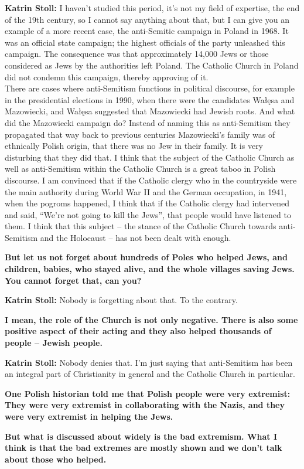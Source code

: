 \textbf{Katrin Stoll:} I haven’t studied this period, it’s not my field of expertise, the end of the 19th century, so I cannot say anything about that, but I can give you an example of a more recent case, the anti-Semitic campaign in Poland in 1968. It was an official state campaign; the highest officials of the party unleashed this campaign. The consequence was that approximately 14,000 Jews or those considered as Jews by the authorities left Poland. The Catholic Church in Poland did not condemn this campaign, thereby approving of it.\\ There are cases where anti-Semitism functions in political discourse, for example in the presidential elections in 1990, when there were the candidates Wałęsa and Mazowiecki, and Wałęsa suggested that Mazowiecki had Jewish roots. And what did the Mazowiecki campaign do? Instead of naming this as anti-Semitism they propagated that way back to previous centuries Mazowiecki’s family was of ethnically Polish origin, that there was no Jew in their family. It is very disturbing that they did that. I think that the subject of the Catholic Church as well as anti-Semitism within the Catholic Church is a great taboo in Polish discourse. I am convinced that if the Catholic clergy who in the countryside were the main authority during World War II and the German occupation, in 1941, when the pogroms happened, I think that if the Catholic clergy had intervened and said, ``We're not going to kill the Jews'', that people would have listened to them. I think that this subject – the stance of the Catholic Church towards anti-Semitism and the Holocaust – has not been dealt with enough. 

\textbf{But let us not forget about hundreds of Poles who helped Jews, and children, babies, who stayed alive, and the whole villages saving Jews. You cannot forget that, can you?}

\textbf{Katrin Stoll:} Nobody is forgetting about that. To the contrary.  

\textbf{I mean, the role of the Church is not only negative. There is also some positive aspect of their acting and they also helped thousands of people – Jewish people.} 

\textbf{Katrin Stoll:} Nobody denies that. I’m just saying that anti-Semitism has been an integral part of Christianity in general and the Catholic Church in particular.  

\textbf{One Polish historian told me that Polish people were very extremist: They were very extremist in collaborating with the Nazis, and they were very extremist in helping the Jews.}\par 
\textbf{But what is discussed about widely is the bad extremism. What I think is that the bad extremes are mostly shown and we don’t talk about those who helped.}

